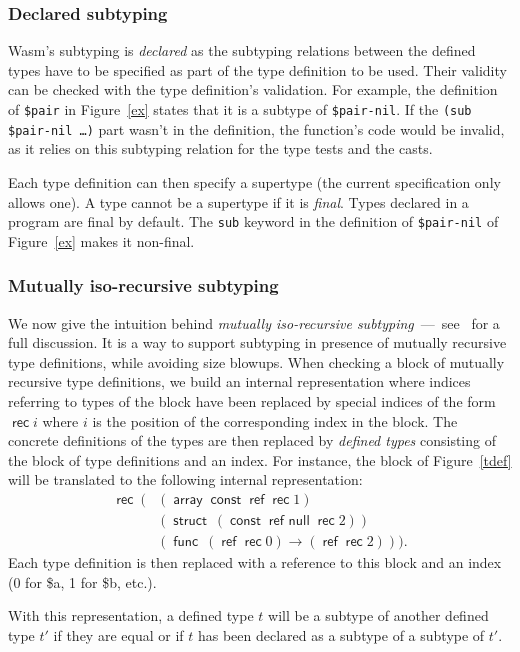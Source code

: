 \documentclass[a4paper,11pt]{article}
\DeclareMathOperator{\reft}{\textsf{ref}}
\DeclareMathOperator{\rect}{\textsf{rec}}
\DeclareMathOperator{\strt}{\textsf{struct}}
\DeclareMathOperator{\arrt}{\textsf{array}}
\DeclareMathOperator{\funt}{\textsf{func}}
\DeclareMathOperator{\cstt}{\textsf{const}}
\DeclareMathOperator{\refnullt}{\textsf{ref null}}
\begin{document}
\subsubsection{Declared subtyping}
Wasm's subtyping is \emph{declared} as the subtyping relations between the
defined types have to be specified as part of the type definition to be used.
Their validity can be checked with the type definition's validation. For
example, the definition of \texttt{\$pair} in Figure~\ref{ex} states that it is
a subtype of \texttt{\$pair-nil}. If the \texttt{(sub \$pair-nil \dots)} part
wasn't in the definition, the function's code would be invalid, as it relies on
this subtyping relation for the type tests and the casts.

Each type definition can then specify a supertype (the current specification
only allows one). A type cannot be a supertype if it is \emph{final}. Types
declared in a program are final by default. The \texttt{sub} keyword in the
definition of \texttt{\$pair-nil} of Figure~\ref{ex} makes it non-final.

\subsubsection{Mutually iso-recursive subtyping}\label{deft}
We now give the intuition behind \emph{mutually iso-recursive
subtyping}~---~see~\cite{rossberg2023mutually} for a full discussion. It is a
way to support subtyping in presence of mutually recursive type definitions,
while avoiding size blowups. When checking a block of mutually recursive type
definitions, we build an internal representation where indices referring to
types of the block have been replaced by special indices of the form $\rect i$
where $i$ is the position of the corresponding index in the block. The concrete
definitions of the types are then replaced by \emph{defined types} consisting of
the block of type definitions and an index. For instance, the block of
Figure~\ref{tdef} will be translated to the following internal representation:
\begin{align*}
\rect\ (& (\arrt \cstt\reft \rect 1)\\
&(\strt\ (\cstt \refnullt \rect 2))\\
&(\funt\ (\reft \rect 0)\to (\reft \rect 2))).
\end{align*}
Each type definition is then replaced with a reference to this block and an
index (0 for \textsf{\$a}, 1 for \textsf{\$b}, etc.).

With this representation, a defined type $t$ will be a subtype of another
defined type $t'$ if they are equal or if $t$ has been declared as a subtype of
a subtype of $t'$.
\end{document}

